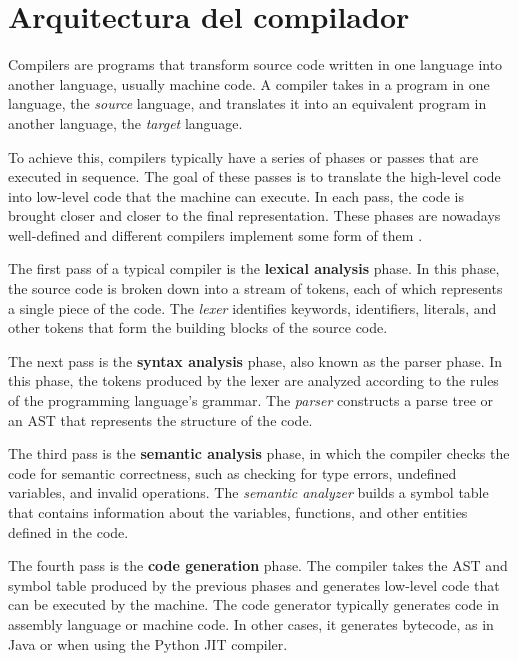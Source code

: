 \section{Arquitectura del compilador}
\label{sec:compiler-architecture}

Compilers are programs that transform source code
written in one language into another language, usually machine code.
A compiler takes in a program in one language, the \emph{source} language,
and translates it into an equivalent program in another language,
the \emph{target} language.

To achieve this, compilers typically have a series of phases or passes
that are executed in sequence.
The goal of these passes is to translate the high-level code
into low-level code that the machine can execute.
In each pass, the code is brought closer and closer to the final representation.
These phases are nowadays well-defined and
different compilers implement some form of them \cite[Chap. 1.2]{aho2014compilers}.

The first pass of a typical compiler is the \textbf{lexical analysis} phase.
In this phase, the source code is broken down into a stream of tokens,
each of which represents a single piece of the code.
The \emph{lexer} identifies keywords, identifiers, literals, and other tokens
that form the building blocks of the source code.

The next pass is the \textbf{syntax analysis} phase, also known as the parser phase.
In this phase, the tokens produced by the lexer are analyzed
according to the rules of the programming language's grammar.
The \emph{parser} constructs a parse tree or an \acrfull{AST}
that represents the structure of the code.

The third pass is the \textbf{semantic analysis} phase,
in which the compiler checks the code for semantic correctness,
such as checking for type errors, undefined variables, and invalid operations.
The \emph{semantic analyzer} builds a symbol table that contains information
about the variables, functions, and other entities defined in the code.

The fourth pass is the \textbf{code generation} phase.
The compiler takes the \acrshort{AST} and symbol table produced by the previous phases
and generates low-level code that can be executed by the machine.
The code generator typically generates code in assembly language or machine code.
In other cases, it generates bytecode,
as in Java or when using the Python \acrfull{JIT} compiler.

